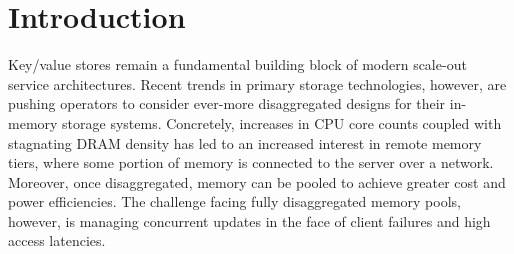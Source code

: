 \section{Introduction}
\label{sec:intro}

Key/value stores remain a fundamental building block of modern
scale-out service architectures.  Recent trends in primary storage
technologies, however, are pushing operators to consider ever-more
disaggregated designs for their in-memory storage systems.
Concretely, increases in CPU core counts coupled with stagnating DRAM
density has led to an increased interest in remote memory tiers, where
some portion of memory is connected to the server over a network.
Moreover, once disaggregated, memory can be pooled to achieve greater
cost and power efficiencies.  The challenge facing fully disaggregated
memory pools, however, is managing concurrent updates in the face of
client failures and high access latencies.

